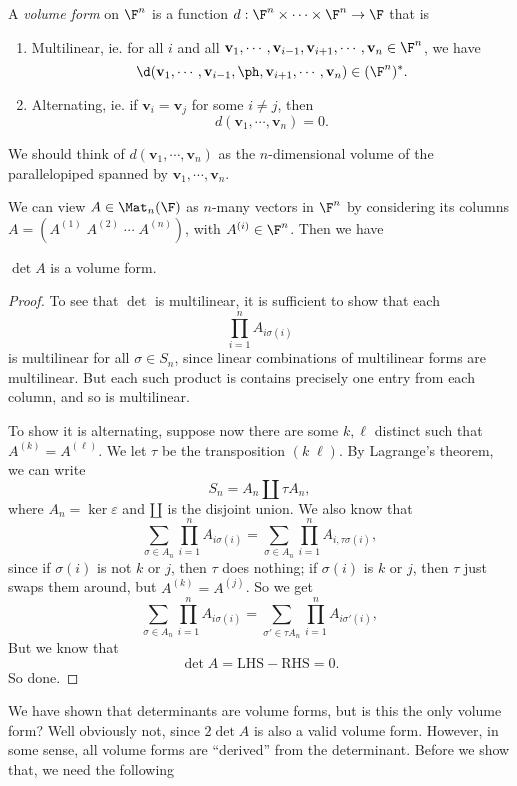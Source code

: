 \documentclass[a4paper]{article}
\begin{document}
\begin{defi}
  A \emph{volume form} on $\F^n$ is a function $d: \F^n \times \cdots \times \F^n \to \F$ that is
  \begin{enumerate}
    \item Multilinear, ie. for all $i$ and all $\mathbf{v}_1, \cdots, \mathbf{v}_{i - 1}, \mathbf{v}_{i + 1}, \cdots, \mathbf{v}_n \in \F^n$, we have
      \[
        \d (\mathbf{v}_1, \cdots, \mathbf{v}_{i - 1}, \ph, \mathbf{v}_{i + 1}, \cdots, \mathbf{v}_n) \in (\F^n)^*.
      \]
    \item Alternating, ie. if $\mathbf{v}_i = \mathbf{v}_j$ for some $i \not= j$, then
      \[
        d(\mathbf{v}_1, \cdots, \mathbf{v}_n) = 0.
      \]
  \end{enumerate}
\end{defi}
We should think of $d(\mathbf{v}_1, \cdots, \mathbf{v}_n)$ as the $n$-dimensional volume of the parallelopiped spanned by $\mathbf{v}_1, \cdots, \mathbf{v}_n$.

We can view $A \in \Mat_n(\F)$ as $n$-many vectors in $\F^n$ by considering its columns $A = (A^{(1)}\; A^{(2)}\; \cdots \; A^{(n)})$, with $A^{(i)} \in \F^n$. Then we have
\begin{lemma}
  $\det A$ is a volume form.
\end{lemma}

\begin{proof}
  To see that $\det$ is multilinear, it is sufficient to show that each
  \[
    \prod_{i = 1}^n A_{i \sigma(i)}
  \]
  is multilinear for all $\sigma \in S_n$, since linear combinations of multilinear forms are multilinear. But each such product is contains precisely one entry from each column, and so is multilinear.

  To show it is alternating, suppose now there are some $k, \ell$ distinct such that $A^{(k)} = A^{(\ell)}$. We let $\tau$ be the transposition $(k\; \ell)$. By Lagrange's theorem, we can write
  \[
    S_n = A_n \amalg \tau A_n,
  \]
  where $A_n = \ker \varepsilon$ and $\amalg$ is the disjoint union. We also know that
  \[
    \sum_{\sigma \in A_n} \prod_{i = 1}^n A_{i \sigma (i)} = \sum_{\sigma \in A_n} \prod_{i = 1}^n A_{i, \tau\sigma(i)},
  \]
  since if $\sigma(i)$ is not $k$ or $j$, then $\tau$ does nothing; if $\sigma(i)$ is $k$ or $j$, then $\tau$ just swaps them around, but $A^{(k)} = A^{(j)}$. So we get
  \[
    \sum_{\sigma \in A_n} \prod_{i = 1}^n A_{i \sigma (i)} = \sum_{\sigma' \in \tau A_n} \prod_{i = 1}^n A_{i\sigma'(i)},
  \]
  But we know that
  \[
    \det A = \text{LHS} - \text{RHS} = 0.
  \]
  So done.
\end{proof}
We have shown that determinants are volume forms, but is this the only volume form? Well obviously not, since $2 \det A$ is also a valid volume form. However, in some sense, all volume forms are ``derived'' from the determinant. Before we show that, we need the following
\end{document}
